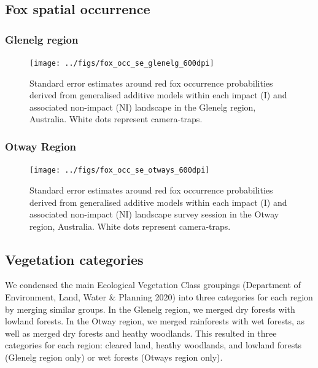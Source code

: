 \documentclass[preprint, 3p, authoryear]{elsarticle} %
\begin{document}
\newpage

\hypertarget{density-app-fox}{%
\subsection{Fox spatial occurrence}\label{density-app-fox}}

\hypertarget{glenelg-region-2}{%
\subsubsection{Glenelg region}\label{glenelg-region-2}}

\begin{figure}

{\centering \texttt{[image: ../figs/fox\_occ\_se\_glenelg\_600dpi]} 

}

\caption{Standard error estimates around red fox occurrence probabilities derived from generalised additive models within each impact (I) and associated non-impact (NI) landscape in the Glenelg region, Australia. White dots represent camera-traps.}\label{fig:density-fox-se-g}
\end{figure}

\newpage

\hypertarget{otway-region-2}{%
\subsubsection{Otway Region}\label{otway-region-2}}

\begin{figure}

{\centering \texttt{[image: ../figs/fox\_occ\_se\_otways\_600dpi]} 

}

\caption{Standard error estimates around red fox occurrence probabilities derived from generalised additive models within each impact (I) and associated non-impact (NI) landscape survey session in the Otway region, Australia. White dots represent camera-traps.}\label{fig:density-fox-se-o}
\end{figure}

\newpage

\hypertarget{density-app-veg}{%
\subsection{Vegetation categories}\label{density-app-veg}}

We condensed the main Ecological Vegetation Class groupings (Department of Environment, Land, Water \& Planning 2020) into three categories for each region by merging similar groups. In the Glenelg region, we merged dry forests with lowland forests. In the Otway region, we merged rainforests with wet forests, as well as merged dry forests and heathy woodlands. This resulted in three categories for each region: cleared land, heathy woodlands, and lowland forests (Glenelg region only) or wet forests (Otways region only).
\end{document}
